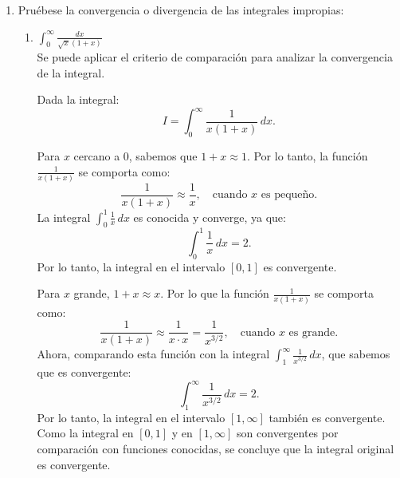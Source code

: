\documentclass{article}
\begin{document}
\begin{enumerate}
\begin{enumerate}
Por lo tanto:
$$
\begin{gathered}
\int_{-\infty}^{\infty} \frac{1}{\left(e^x+e^{-x}\right)} d x=\int_{-\infty}^{\infty} \frac{1}{\left(u+\frac{1}{u}\right)} \frac{d u}{u} \\
=\int_0^{\infty} \frac{1}{\left(u^2+1\right)} d u \\
\int_0^{\infty} \frac{1}{\left(u^2+1\right)} d u=\arctan (u)
\end{gathered}
$$

Evaluamos:
$$
\begin{gathered}
\int_0^{\infty} \frac{1}{\left(u^2+1\right)} d u=[\arctan (u)]_0^{\infty} \\
\int_0^{\infty} \frac{1}{\left(u^2+1\right)} d u=\frac{\pi}{2}-0=\frac{\pi}{2}
\end{gathered}
$$

La solución de la integral es:
$$
\int_{-\infty}^{\infty} \frac{e^x}{1+e^{2 x}} d x=\frac{\pi}{2}
$$
        
		\item $ \int_{-\infty}^{\infty} \frac{dx}{\sqrt{x}(1+x)} $

La función no está definida para $x \leq 0$ ($\sqrt{x}$) debido a lo cual la integral no tiene sentido en $(-\infty, \infty)$,  
por lo que la integral no existe.

        
	\end{enumerate}	
	
	\item Pru\'ebese la convergencia o divergencia de las integrales impropias:
	\begin{enumerate}
		\item $ \int_{0}^{\infty} \frac{dx}{\sqrt{x}(1+x)} $
        \[\]
        Se puede aplicar el criterio de comparación para analizar la convergencia de la integral.

Dada la integral:
\[
I = \int_{0}^{\infty} \frac{1}{x(1+x)} \, dx.
\]
 
Para \(x\) cercano a \(0\), sabemos que \(1+x \approx 1\). Por lo tanto, la función \(\frac{1}{x(1+x)}\) se comporta como:
\[
\frac{1}{x(1+x)} \approx \frac{1}{x}, \quad \text{cuando } x \text{ es pequeño.}
\]
La integral \(\int_{0}^{1} \frac{1}{x} \, dx\) es conocida y converge, ya que:
\[
\int_{0}^{1} \frac{1}{x} \, dx = 2.
\]
Por lo tanto, la integral en el intervalo \([0, 1]\) es convergente.
 
Para \(x\) grande, \(1+x \approx x\). Por lo que la función \(\frac{1}{x(1+x)}\) se comporta como:
\[
\frac{1}{x(1+x)} \approx \frac{1}{x \cdot x} = \frac{1}{x^{3/2}}, \quad \text{cuando } x \text{ es grande.}
\]
Ahora, comparando esta función con la integral \(\int_{1}^{\infty} \frac{1}{x^{3/2}} \, dx\), que sabemos que es convergente:
\[
\int_{1}^{\infty} \frac{1}{x^{3/2}} \, dx = 2.
\]
Por lo tanto, la integral en el intervalo \([1, \infty]\) también es convergente. Como la integral en \([0, 1]\) y en \([1, \infty]\) son convergentes por comparación con funciones conocidas, se concluye que la integral original es convergente.


\end{enumerate}
\end{enumerate}
\end{document}
